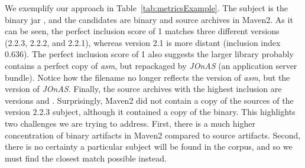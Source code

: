 We exemplify our approach in Table~\ref{tab:metricsExample}. The
subject is the binary jar , and the candidates are
binary and source archives in Maven2. As it can be seen, the
perfect inclusion score of 1 matches three different versions (2.2.3, 2.2.2, and 2.2.1), whereas
version 2.1 is more distant (inclusion index 0.636). The perfect inclusion score
of 1 also suggests the larger  library probably contains a
perfect copy of \emph{asm}, but repackaged by \emph{JOnAS} (an application server
bundle). Notice how the filename no longer reflects the version of
\emph{asm}, but the version of \emph{JOnAS}. Finally, the source archives with the
highest inclusion are versions  and . Surprisingly, Maven2 did not
contain a copy of the sources of the version 2.2.3 subject, although it contained a copy
of the binary. This highlights two challenges we are trying to
address.  First, there is a much higher concentration of binary
artifacts in Maven2 compared to source artifacts.
Second, there is no certainty a particular subject will be found in the
corpus, and so we must find the closest match possible instead.



